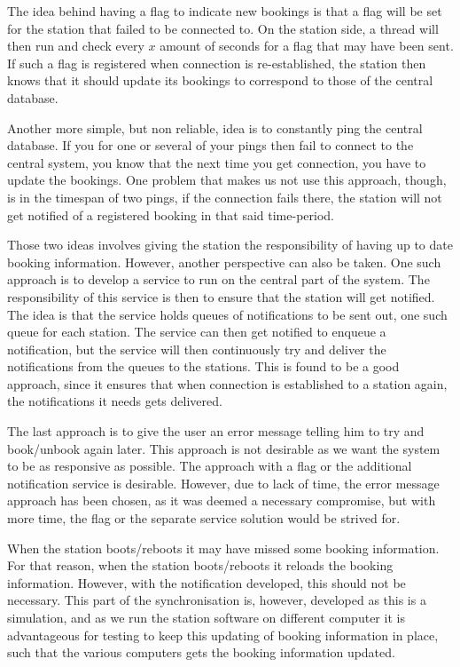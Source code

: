 \begin{description}[style=nextline]
	The idea behind having a flag to indicate new bookings is that a flag will be set for the station that failed to be connected to.
	On the station side, a thread will then run and check every $x$ amount of seconds for a flag that may have been sent.
	If such a flag is registered when connection is re-established, the station then knows that it should update its bookings to correspond to those of the central database.
	
	Another more simple, but non reliable, idea is to constantly ping the central database.
	If you for one or several of your pings then fail to connect to the central system, you know that the next time you get connection, you have to update the bookings.
	One problem that makes us not use this approach, though, is in the timespan of two pings, if the connection fails there, the station will not get notified of a registered booking in that said time-period.
	
	Those two ideas involves giving the station the responsibility of having up to date booking information.
	However, another perspective can also be taken.
	One such approach is to develop a service to run on the central part of the system.
	The responsibility of this service is then to ensure that the station will get notified.
	The idea is that the service holds queues of notifications to be sent out, one such queue for each station.
	The service can then get notified to enqueue a notification, but the service will then continuously try and deliver the notifications from the queues to the stations. 
	This is found to be a good approach, since it ensures that when connection is established to a station again, the notifications it needs gets delivered.
	
	The last approach is to give the user an error message telling him to try and book/unbook again later.
	This approach is not desirable as we want the system to be as responsive as possible.
	The approach with a flag or the additional notification service is desirable.
	However, due to lack of time, the error message approach has been chosen, as it was deemed a necessary compromise, but with more time, the flag or the separate service solution would be strived for.
	 
	
	\item[Station boot/reboot]
	When the station boots/reboots it may have missed some booking information.
	For that reason, when the station boots/reboots it reloads the booking information.
	However, with the notification developed, this should not be necessary.
	This part of the synchronisation is, however, developed as this is a simulation, and as we run the station software on different computer it is advantageous for testing to keep this updating of booking information in place, such that the various computers gets the booking information updated.
	

\end{description}
